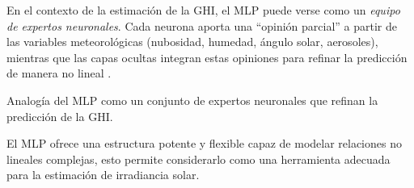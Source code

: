 \documentclass[letterpaper,12pt, twoside]{report}
\providecommand{\DIFdeltex}[1]{{\protect\color{red} \scriptsize #1}} %
\providecommand{\DIFdelFL}[1]{\DIFdel{#1}} %
\providecommand{\DIFdel}[1]{\texorpdfstring{\DIFdeltex{#1}}{}} %
\begin{document}
\DIFdel{En el contexto de la estimación de la GHI, el MLP puede verse como un \textit{equipo de expertos neuronales}. Cada neurona aporta una “opinión parcial” a partir de las variables meteorológicas (nubosidad, humedad, ángulo solar, aerosoles), mientras que las capas ocultas integran estas opiniones para refinar la predicción de manera no lineal \citep{torobayona2012mlp}.  
}%





{%
\DIFdelFL{Analogía del MLP como un conjunto de expertos neuronales que refinan la predicción de la GHI.}}

\DIFdel{El MLP ofrece una estructura potente y flexible capaz de modelar relaciones no lineales complejas, esto permite considerarlo como una herramienta adecuada para la estimación de irradiancia solar.
}%
\end{document}
